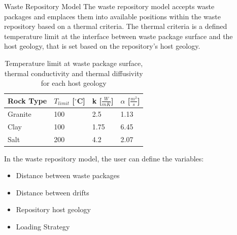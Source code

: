 \documentclass[final]{beamer}
\newlength{\sepwid}
\newlength{\onecolwid}
\newlength{\threecolwid}
\begin{document}
\begin{frame}[t]
\begin{columns}[t,totalwidth=\threecolwid]
\begin{column}{\onecolwid}

\end{column} %

\begin{column}{\sepwid}\end{column} %



\begin{column}{\onecolwid} %

\begin{block}{Waste Repository Model}
The waste repository model accepts waste packages and emplaces them into 
available positions within the waste repository based on a thermal criteria.  
The thermal criteria is a defined temperature limit at the interface between waste 
package surface and the host geology, that is set based on the repository's host geology.

\begin{table}[]
	\label{tab:temp_limit}
	\caption{Temperature limit at waste package surface, thermal conductivity 
	and thermal diffusivity for each host geology \cite{sutton_investigations_2011}}
	\begin{tabular}{|l|l|l|l|}
	\hline
	Rock Type & $T_{limit}$ [$^\circ$C] & k [$\frac{W}{mK}$] &  $\alpha$ [$\frac{m^2}{s}$]  \\ \hline
	Granite   & 100 & 2.5  & 1.13\\ \hline
	Clay      & 100 & 1.75 & 6.45\\ \hline
	Salt      & 200 & 4.2  & 2.07\\ \hline
	\end{tabular}
\end{table}

In the waste repository model, the user can define the variables: 
	\begin{itemize}
		\item Distance between waste packages
		\item Distance between drifts 
		\item Repository host geology 
		\item Loading Strategy 
	\end{itemize}


\end{block}
\end{column}
\end{columns}
\end{frame}
\end{document}
